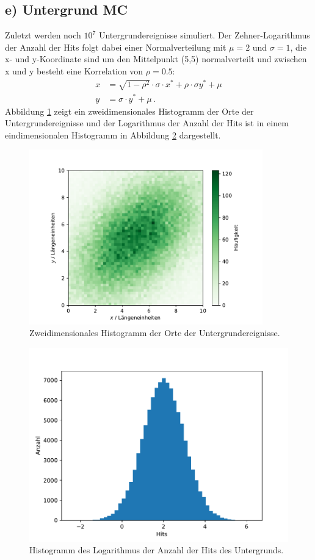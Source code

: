 \documentclass[a4paper, 11pt]{article}
\begin{document}
\subsection*{e) Untergrund MC}
Zuletzt werden noch $10^7$ Untergrundereignisse simuliert. Der Zehner-Logarithmus
der Anzahl der Hits folgt dabei einer Normalverteilung mit $\mu = 2$ und $\sigma=1$,
die x- und y-Koordinate sind um den Mittelpunkt (5,5) normalverteilt und zwischen
x und y besteht eine Korrelation von $\rho=0.5$:
\begin{align}
  x &= \sqrt{1-\rho^2} \cdot \sigma \cdot x^\text{*} + \rho \cdot \sigma y^\text{*} + \mu\\
  y &= \sigma \cdot y^\text{*} + \mu \,.
\end{align}
Abbildung \ref{fig:orte-background} zeigt ein zweidimensionales Histogramm der
Orte der Untergrundereignisse und der Logarithmus der Anzahl der Hits ist in einem
eindimensionalen Histogramm in Abbildung \ref{fig:hits-background} dargestellt.
\begin{figure}
  \centering
  \includegraphics[width=0.9\textwidth]{../OrteBackground.pdf}
  \caption{Zweidimensionales Histogramm der Orte der Untergrundereignisse.}
  \label{fig:orte-background}
\end{figure}
\begin{figure}
  \centering
  \includegraphics{../HitsBackground.pdf}
  \caption{Histogramm des Logarithmus der Anzahl der Hits des Untergrunds.}
  \label{fig:hits-background}
\end{figure}
\end{document}
